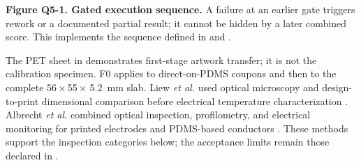 \vspace{0.55em}
\begin{center}
\end{center}
{\fontsize{7.5}{8.7}\selectfont\color{AUBGray}
\textbf{Figure Q5-1. Gated execution sequence.} A failure at an earlier gate
triggers rework or a documented partial result; it cannot be hidden by a later
combined score. This implements the sequence defined in
 and
.\par}

\clearpage
\hypertarget{q5-release}{}


{\fontsize{9.15}{10.75}\selectfont
The PET sheet in  demonstrates
first-stage artwork transfer; it is not the calibration specimen. F0 applies
to direct-on-PDMS coupons and then to the complete 56\,$\times$\,55\,$\times$
5.2~mm slab. Liew \textit{et al.} used optical microscopy and design-to-print
dimensional comparison before electrical temperature characterization
\cite{liew2020}. Albrecht \textit{et al.} combined optical inspection,
profilometry, and electrical monitoring for printed electrodes and PDMS-based
conductors \cite{albrecht2019,albrecht2018stretch}. These methods support the
inspection categories below; the acceptance limits remain those declared in
.\par}

